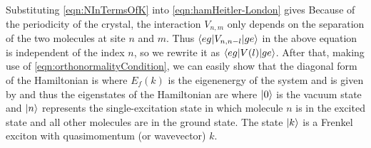 Substituting \autoref{eqn:NInTermsOfK} into \autoref{eqn:hamHeitler-London} gives
Because of the periodicity of the crystal, the interaction $V_{n, m}$ only depends on the separation of the two molecules
at site $n$ and $m$. Thus  $\langle eg | V_{n, n-l}  | ge \rangle $ in the above equation is independent of the index $n$, so 
we rewrite it as $\langle eg | V(l)  | ge \rangle$. After that, making use of \autoref{eqn:orthonormalityCondition}, we can easily show
that the diagonal form of the Hamiltonian is
where $E_f(k) $ is the eigenenergy of the system and is given by
and thus the eigenstates of the Hamiltonian are
where $| 0 \rangle$ is the vacuum state and $| n \rangle$ represents the single-excitation state in which molecule $n$ is in the 
excited state and all other molecules are in the ground state. The state $| k \rangle$ is a Frenkel exciton with 
quasimomentum (or wavevector) $k$. 








